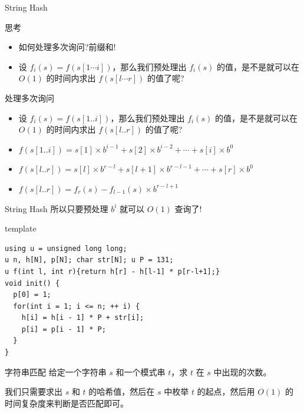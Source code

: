 \documentclass{ldr-simple-gray}
\begin{document}
  \begin{frame}{String Hash}
    \begin{block}{思考}
      \begin{itemize}
        \item 如何处理多次询问?前缀和!
        \item 设 $f_{i}(s)=f(s[1\cdots i])$，那么我们预处理出 $f_{i}(s)$ 的值，是不是就可以在 $O(1)$ 的时间内求出 $f(s[l\cdots r])$ 的值了呢?
      \end{itemize}
    \end{block}

    \begin{block}{处理多次询问}
      \begin{itemize}
        \item 设 $f_{i}(s)=f(s[1..i])$，那么我们预处理出 $f_{i}(s)$ 的值，是不是就可以在 $O(1)$ 的时间内求出 $f(s[l..r])$ 的值了呢?
        \item $f(s[1..i])=s[1]\times{b^{i-1}}+s[2]\times{b^{i-2}}+\cdots+s[i]\times{b^{0}}$
        \item $f(s[l..r])=s[l]\times{b^{r-l}}+s[l+1]\times{b^{r-l-1}}+\cdots+s[r]\times{b^{0}}$
        \item $f(s[l..r])=f_{r}(s)-f_{l-1}(s)\times{b^{r-l+1}}$
      \end{itemize}
    \end{block}
  \end{frame}

  \begin{frame}[fragile]{String Hash}
    所以只要预处理 $b^i$ 就可以 $O(1)$ 查询了!
    \begin{block}{template}
      \begin{verbatim}
using u = unsigned long long;
u n, h[N], p[N]; char str[N]; u P = 131;
u f(int l, int r){return h[r] - h[l-1] * p[r-l+1];} 
void init() {
  p[0] = 1;
  for(int i = 1; i <= n; ++ i) {
    h[i] = h[i - 1] * P + str[i];
    p[i] = p[i - 1] * P;
  }
}\end{verbatim}
    \end{block}
  \end{frame}

  \begin{frame}{字符串匹配}
    给定一个字符串 $s$ 和一个模式串 $t$，求 $t$ 在 $s$ 中出现的次数。\newline

    我们只需要求出 $s$ 和 $t$ 的哈希值，然后在 $s$ 中枚举 $t$ 的起点，然后用 $O(1)$ 的时间复杂度来判断是否匹配即可。
  \end{frame}
\end{document}
